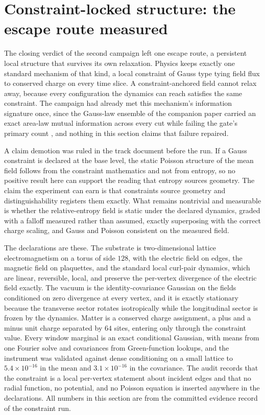 \documentclass[aps,pre,reprint,nofootinbib]{revtex4-2}
\begin{document}
\section{Constraint-locked structure: the escape route measured}
\label{sec:eg4d}

The closing verdict of the second campaign left one escape route, a
persistent local structure that survives its own relaxation.
Physics keeps exactly one standard mechanism of that kind, a local
constraint of Gauss type tying field flux to conserved charge on
every time slice.  A constraint-anchored field cannot relax away,
because every configuration the dynamics can reach satisfies the
same constraint.  The campaign had already met this mechanism's
information signature once, since the Gauss-law ensemble of the
companion paper carried an exact area-law mutual information across
every cut while failing the gate's primary count
\cite{AreaGatePaper}, and nothing in this section claims that
failure repaired.

A claim demotion was ruled in the track document before the run.
If a Gauss constraint is declared at the base level, the static
Poisson structure of the mean field follows from the constraint
mathematics and not from entropy, so no positive result here can
support the reading that entropy sources geometry.  The
claim the experiment can earn is that constraints source geometry
and distinguishability registers them exactly.  What remains
nontrivial and measurable is whether the relative-entropy field is
static under the declared dynamics, graded with a falloff measured
rather than assumed, exactly superposing with the correct charge
scaling, and Gauss and Poisson consistent on the measured field.

The declarations are these.  The substrate is two-dimensional
lattice electromagnetism on a torus of side $128$, with the
electric field on edges, the magnetic field on plaquettes, and the
standard local curl-pair dynamics, which are linear, reversible,
local, and preserve the per-vertex divergence of the electric field
exactly.  The vacuum is the identity-covariance Gaussian on the
fields conditioned on zero divergence at every vertex, and it is
exactly stationary because the transverse sector rotates
isotropically while the longitudinal sector is frozen by the
dynamics.  Matter is a conserved charge assignment, a plus and a
minus unit charge separated by $64$ sites, entering only through
the constraint value.  Every window marginal is an exact
conditional Gaussian, with means from one Fourier solve and
covariances from Green-function lookups, and the instrument was
validated against dense conditioning on a small lattice to
$5.4\times10^{-16}$ in the mean and $3.1\times10^{-16}$ in the
covariance.  The audit records that the constraint is a local
per-vertex statement about incident edges and that no radial
function, no potential, and no Poisson equation is inserted
anywhere in the declarations.  All numbers in this section are from
the committed evidence record of the constraint run.
\end{document}
